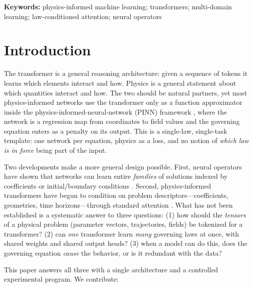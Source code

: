 \documentclass[11pt,a4paper]{article}
\begin{document}
\noindent\textbf{Keywords:} physics-informed machine learning; transformers;
multi-domain learning; law-conditioned attention; neural operators

\section{Introduction}
\label{sec:intro}

The transformer \cite{vaswani2017attention} is a general reasoning
architecture: given a sequence of tokens it learns which elements interact and
how. Physics is a general statement about which quantities interact and how.
The two should be natural partners, yet most physics-informed networks use the
transformer only as a function approximator inside the
physics-informed-neural-network (PINN) framework \cite{raissi2019physics,
karniadakis2021physics}, where the network is a regression map from
coordinates to field values and the governing equation enters as a penalty on
its output. This is a single-law, single-task template: one network per
equation, physics as a loss, and no notion of \emph{which law is in force}
being part of the input.

Two developments make a more general design possible. First, neural operators
have shown that networks can learn entire \emph{families} of solutions indexed
by coefficients or initial/boundary conditions \cite{li2021fourier,
lu2021deeponet, li2020multipole}. Second, physics-informed transformers have
begun to condition on problem descriptors---coefficients, geometries, time
horizons---through standard attention \cite{liu2024physics, peng2021pinn}.
What has not been established is a systematic answer to three questions:
(1) how should the \emph{tensors} of a physical problem (parameter vectors,
trajectories, fields) be tokenized for a transformer? (2) can \emph{one}
transformer learn \emph{many} governing laws at once, with shared weights and
shared output heads? (3) when a model can do this, does the governing equation
\emph{cause} the behavior, or is it redundant with the data?

This paper answers all three with a single architecture and a controlled
experimental program. We contribute:
\end{document}
